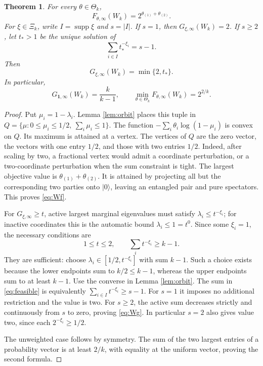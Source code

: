 \documentclass[11pt,a4paper]{article}
\newtheorem{theorem}{Theorem}
\newcommand{\supp}{\operatorname{supp}}
\newcommand{\one}{\mathbf 1}
\newcommand{\ket}[1]{|#1\rangle}
\begin{document}
\begin{theorem}\label{thm:W}
For every \(\theta\in\Theta_k\),
\begin{equation}
 F_{\theta,\infty}(W_k)=2^{\theta_{(1)}+\theta_{(2)}}.
 \label{eq:Wf}
\end{equation}
For \(\xi\in\Xi_k\), write \(I=\supp\xi\) and \(s=|I|\).
If \(s=1\), then \(G_{\xi,\infty}(W_k)=2\).
If \(s\ge2\), let \(t_*>1\) be the unique solution of
\[
 \sum_{i\in I}t_*^{-\xi_i}=s-1.
\]
Then
\begin{equation}
 G_{\xi,\infty}(W_k)=\min\{2,t_*\}.
 \label{eq:Wg}
\end{equation}
In particular,
\begin{equation}
 G_{\one,\infty}(W_k)=\frac{k}{k-1},\qquad
 \min_{\theta\in\Theta_k}F_{\theta,\infty}(W_k)=2^{2/k}.
 \label{eq:unweighted}
\end{equation}
\end{theorem}
\begin{proof}
Put \(\mu_i=1-\lambda_i\). Lemma \ref{lem:orbit} places this tuple
in \(Q=\{\mu:0\le\mu_i\le1/2,\ \sum_i\mu_i\le1\}\).
The function \(-\sum_i\theta_i\log(1-\mu_i)\) is convex on \(Q\).
Its maximum is attained at a vertex. The vertices of \(Q\) are
the zero vector, the vectors with one entry \(1/2\), and those with
two entries \(1/2\). Indeed, after scaling by two, a fractional
vertex would admit a coordinate perturbation, or a two-coordinate
perturbation when the sum constraint is tight.
The largest objective value is \(\theta_{(1)}+\theta_{(2)}\).
It is attained by projecting all but the corresponding two parties
onto \(\ket0\), leaving an entangled pair and pure spectators.
This proves \eqref{eq:Wf}.

For \(G_{\xi,\infty}\ge t\), active largest marginal eigenvalues
must satisfy \(\lambda_i\le t^{-\xi_i}\); for inactive coordinates
this is the automatic bound \(\lambda_i\le1=t^0\). Since some \(\xi_i=1\),
the necessary conditions are
\begin{equation}
 1\le t\le2,\qquad \sum_it^{-\xi_i}\ge k-1.
 \label{eq:feasible}
\end{equation}
They are sufficient: choose
\(\lambda_i\in[1/2,t^{-\xi_i}]\) with sum \(k-1\).
Such a choice exists because the lower endpoints sum to \(k/2\le k-1\),
whereas the upper endpoints sum to at least \(k-1\).
Use the converse in Lemma \ref{lem:orbit}. The sum in
\eqref{eq:feasible} is equivalently
\(\sum_{i\in I}t^{-\xi_i}\ge s-1\).
For \(s=1\) it imposes no additional restriction and the value is two.
For \(s\ge2\), the active sum decreases strictly and continuously
from \(s\) to zero, proving \eqref{eq:Wg}. In particular \(s=2\)
also gives value two, since each \(2^{-\xi_i}\ge1/2\).

The unweighted case follows by symmetry. The sum of the two largest
entries of a probability vector is at least \(2/k\), with equality
at the uniform vector, proving the second formula.
\end{proof}
\end{document}
